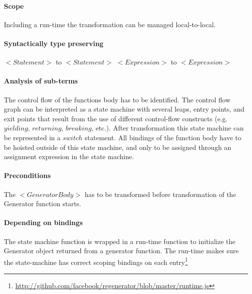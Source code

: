 \paragraph{Scope}
Including a run-time the transformation can be managed local-to-local.

\paragraph{Syntactically type preserving}
$<Statement>$ to $<Statement>$
$<Expression>$ to $<Expression>$

\paragraph{Analysis of sub-terms}
The control flow of the functions body has to be identified. The control flow graph can be interpreted as a state machine with several leaps, entry points, and exit points that result from the use of different control-flow constructs (e.g. $yielding$, $returning$, $breaking$, etc.). After transformation this state machine can be represented in a $switch$ statement. All bindings of the function body have to be hoisted outside of this state machine, and only to be assigned through an assignment expression in the state machine. 

\paragraph{Preconditions}
The $<GeneratorBody>$ has to be transformed before transformation of the Generator function starts.

\paragraph{Depending on bindings}
The state machine function is wrapped in a run-time function to initialize the Generator object returned from a generator function. The run-time makes sure the state-machine has correct scoping bindings on each entry\footnote{\url{http://github.com/facebook/regenerator/blob/master/runtime.js}}

